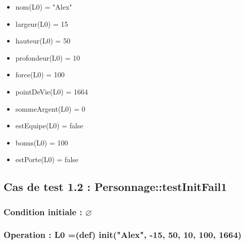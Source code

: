 \documentclass[11pt]{article}
\begin{document}
\begin{itemize}

\item nom(L0) = "Alex"\\
\label{sec-1.1.3.1}


\item largeur(L0) = 15\\
\label{sec-1.1.3.2}


\item hauteur(L0) = 50\\
\label{sec-1.1.3.3}


\item profondeur(L0) = 10\\
\label{sec-1.1.3.4}


\item force(L0) = 100\\
\label{sec-1.1.3.5}


\item pointDeVie(L0) = 1664\\
\label{sec-1.1.3.6}


\item sommeArgent(L0) = 0\\
\label{sec-1.1.3.7}


\item estEquipe(L0) = false\\
\label{sec-1.1.3.8}


\item bonus(L0) = 100\\
\label{sec-1.1.3.9}


\item estPorte(L0) = false\\
\label{sec-1.1.3.10}



\end{itemize} %
\subsection{Cas de test 1.2 : Personnage::testInitFail1}
\label{sec-1.2}

\subsubsection{Condition initiale : $\varnothing$}
\label{sec-1.2.1}

\subsubsection{Operation : L0 =(def) init("Alex", -15, 50, 10, 100, 1664)}
\label{sec-1.2.2}
\end{document}
